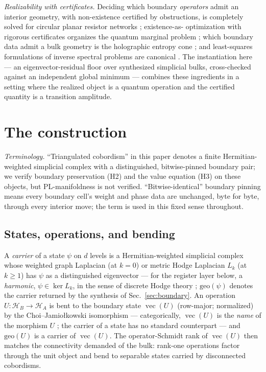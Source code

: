 \documentclass[a4paper,twocolumn,11pt,unpublished]{quantumarticle}
\theoremstyle{plain}
\theoremstyle{remark}
\newcommand{\geo}{\mathrm{geo}}
\newcommand{\vecop}{\operatorname{vec}}
\newcommand{\kerL}{\ker L}
\begin{document}
\emph{Realizability with certificates.} Deciding which boundary
\emph{operators} admit an interior geometry, with non-existence certified
by obstructions, is completely solved for circular planar resistor
networks \cite{CurtisIngermanMorrow1998Circular}; existence-as-
optimization with rigorous certificates organizes the quantum marginal
problem \cite{Yu2021MarginalHierarchy}; which boundary data admit a bulk
geometry is the holographic entropy cone \cite{Bao2015EntropyCone}; and
least-squares formulations of inverse spectral problems are canonical
\cite{ChuGolub2005InverseEigenvalue}. The instantiation here --- an
eigenvector-residual floor over synthesized simplicial bulks,
cross-checked against an independent global minimum --- combines these
ingredients in a setting where the realized object is a quantum operation
and the certified quantity is a transition amplitude.

\section{The construction}
\label{sec:method}

\emph{Terminology.} ``Triangulated cobordism'' in this paper denotes a
finite Hermitian-weighted simplicial complex with a distinguished,
bitwise-pinned boundary pair; we verify boundary preservation (H2) and the
value equation (H3) on these objects, but PL-manifoldness is not verified.
``Bitwise-identical'' boundary pinning means every boundary cell's weight
and phase data are unchanged, byte for byte, through every interior move;
the term is used in this fixed sense throughout.

\subsection{States, operations, and bending}

A \emph{carrier} of a state $\psi$ on $d$ levels is a Hermitian-weighted
simplicial complex whose weighted graph Laplacian (at $k=0$) or metric
Hodge Laplacian $L_k$ (at $k\ge1$) has $\psi$ as a distinguished
eigenvector --- for the register layer below, a \emph{harmonic},
$\psi\in\kerL_k$, in the sense of discrete Hodge theory
\cite{Eckmann1945Harmonische,Lim2020HodgeLaplacians}; $\geo(\psi)$
denotes the carrier returned by the synthesis of
Sec.~\ref{sec:boundary}. An operation
$U:\mathcal{H}_B\to\mathcal{H}_A$ is bent to the boundary state
$\vecop(U)$ (row-major; normalized) by the Choi--Jamio{\l}kowski
isomorphism --- categorically, $\vecop(U)$ is the \emph{name} of the
morphism $U$ \cite{AbramskyCoecke2004Categorical}; the carrier of a
state has no standard counterpart --- and $\geo(U)$ is a carrier of
$\vecop(U)$. The operator-Schmidt rank of $\vecop(U)$
\cite{Nielsen2003DynamicsResource} then matches the connectivity demanded
of the bulk: rank-one operations factor through the unit object and bend
to separable states carried by disconnected cobordisms.
\end{document}

